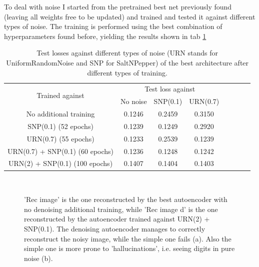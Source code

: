 \documentclass[a4paper, 11pt]{article}
\begin{document}
    To deal with noise I started from the pretrained best net previously found (leaving all weights free to be updated) and trained and tested it against different types of noise. The training is performed using the best combination of hyperparameters found before, yielding the results shown in tab \ref{tab:denoising_loss}
    \begin{table}[H]
      \centering
      \begin{tabular}{c|ccccccc}
        \multirow{2}{*}{Trained against} & \multicolumn{3}{c}{Test loss against} \\
          & No noise & SNP(0.1) & URN(0.7) \\
        \midrule
        No additional training & 0.1246 & 0.2459 & 0.3150 \\
        SNP(0.1) (52 epochs) & 0.1239 & 0.1249 & 0.2920 \\
        URN(0.7) (55 epochs) & 0.1233 & 0.2539 & 0.1239 \\
        URN(0.7) + SNP(0.1) (60 epochs) & 0.1236 & 0.1248 & 0.1242 \\
        URN(2) + SNP(0.1) (100 epochs) & 0.1407 & 0.1404 & 0.1403 \\
        \bottomrule
      \end{tabular}
      \caption{Test losses against different types of noise (URN stands for UniformRandomNoise and SNP for SaltNPepper) of the best architecture after different types of training.}
      \label{tab:denoising_loss}
    \end{table}
    \begin{figure}
      \centering
       \,
      \caption{'Rec image' is the one reconstructed by the best autoencoder with no denoising additional training, while 'Rec image d' is the one reconstructed by the autoencoder trained against URN(2) + SNP(0.1). The denoising autoencoder manages to correctly reconstruct the noisy image, while the simple one fails (a). Also the simple one is more prone to 'hallucinations', i.e. seeing digits in pure noise (b).}
      \label{fig:hallucination}
    \end{figure}
\end{document}
